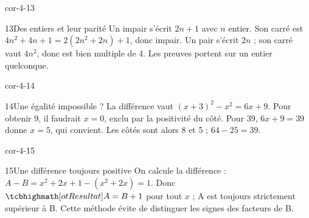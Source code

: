 \begin{blocLivre}{cor-4-13}\begin{corrige}{13}{Des entiers et leur parité}
Un impair s’écrit $2n+1$ avec $n$ entier. Son carré est $4n^2+4n+1=2(2n^2+2n)+1$, donc impair. Un pair s’écrit $2n$ ; son carré vaut $4n^2$, donc est bien multiple de 4. Les preuves portent sur un entier quelconque.
\end{corrige}\end{blocLivre}
\begin{blocLivre}{cor-4-14}\begin{corrige}{14}{Une égalité impossible ?}
La différence vaut $(x+3)^2-x^2=6x+9$. Pour obtenir 9, il faudrait $x=0$, exclu par la positivité du côté. Pour 39, $6x+9=39$ donne $x=5$, qui convient. Les côtés sont alors 8 et 5 ; $64-25=39$.
\end{corrige}\end{blocLivre}
\begin{blocLivre}{cor-4-15}\begin{corrige}{15}{Une différence toujours positive}
On calcule la différence : $A-B=x^2+2x+1-(x^2+2x)=1$. Donc $\res{A=B+1}$ pour tout $x$ ; A est toujours strictement supérieur à B. Cette méthode évite de distinguer les signes des facteurs de B.
\end{corrige}\end{blocLivre}
